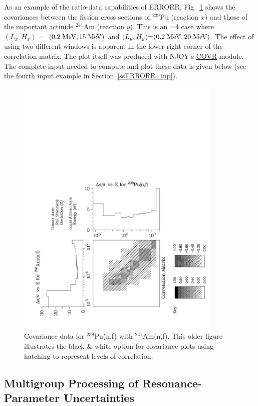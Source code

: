 As an example of the ratio-data capabilities of ERRORR,  Fig.~\ref{ratcov}
shows the covariances between the fission cross sections of $^{239}$Pu
(reaction $x$) and those of the important actinide $^{241}$Am (reaction
$y$).  This is an =4 case where $(L_x, H_x){=}$ $(0.2 \;{\rm
MeV}, 15 \;{\rm MeV})$ and $(L_y, H_y){=}(0.2 \;{\rm MeV}, 20 \; {\rm
MeV})$.  The effect of using two different windows is apparent in
the lower right corner of the correlation matrix.  The plot itself was
produced with NJOY's \hyperlink{sCOVRhy}{COVR}
module.  The complete input needed to compute and plot these data is
given below (see the fourth input example in Section~\ref{ssERRORR_inp}).

\begin{figure}[t]\centering
\includegraphics[keepaspectratio, height=5in, angle=270]{figs/errorr2ack}
\caption[Ratioed covariance data for $^{239}$Pu(n,f) and $^{241}$Am(n,f)
 cross sections]{Covariance data for $^{239}$Pu(n,f) with $^{241}$Am(n,f).
 This older figure illustrates the black \& white option for covariance
 plots using hatching to represent levels of correlation.}
\label{ratcov}
\end{figure}

\subsection{Multigroup Processing of Resonance-Parameter Uncertainties}
\label{ssERRORR_MGRR}

